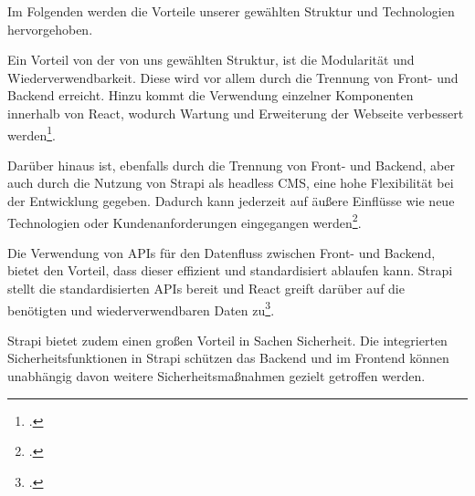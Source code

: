 Im Folgenden werden die Vorteile unserer gewählten Struktur und Technologien hervorgehoben.

Ein Vorteil von der von uns gewählten Struktur, ist die Modularität und Wiederverwendbarkeit. Diese wird vor allem durch die Trennung von Front- und Backend erreicht. Hinzu kommt die Verwendung einzelner Komponenten innerhalb von React, wodurch Wartung und Erweiterung der Webseite verbessert werden\footcite{acharya_15_2023}.

Darüber hinaus ist, ebenfalls durch die Trennung von Front- und Backend, aber auch durch die Nutzung von Strapi als headless CMS, eine hohe Flexibilität bei der Entwicklung gegeben. Dadurch kann jederzeit auf äußere Einflüsse wie neue Technologien oder Kundenanforderungen eingegangen werden\footcite{autor_warum_nodate}.

Die Verwendung von APIs für den Datenfluss zwischen Front- und Backend, bietet den Vorteil, dass dieser effizient und standardisiert ablaufen kann. Strapi stellt die standardisierten APIs bereit und React greift darüber auf die benötigten und wiederverwendbaren Daten zu\footcite{autor_headless-cms_nodate}.

Strapi bietet zudem einen großen Vorteil in Sachen Sicherheit. Die integrierten Sicherheitsfunktionen in Strapi schützen das Backend und im Frontend können unabhängig davon weitere Sicherheitsmaßnahmen gezielt getroffen werden.
